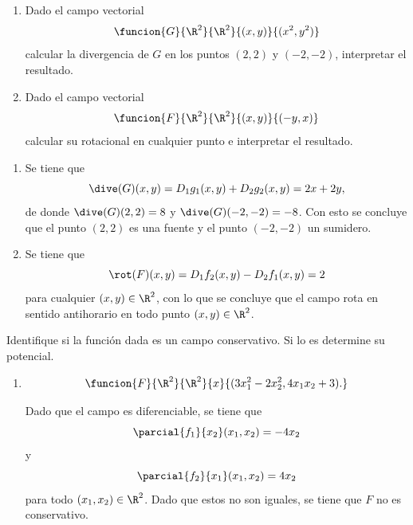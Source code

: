 \documentclass[a4,11pt]{aleph-examen}
\begin{document}
\begin{preguntas}
\begin{respuesta}
\begin{respuesta}
\item
    \begin{enumerate}
        \item Dado el campo vectorial
            \[
                \funcion{G}{\R^2}{\R^2}{(x,y)}{(x^2,y^2)}
            \]
            calcular la divergencia de $G$ en los puntos $(2,2)$ y $(-2,-2)$, interpretar el resultado.
    
        \item Dado el campo vectorial 
            \[
                \funcion{F}{\R^2}{\R^2}{(x,y)}{(-y,x)}
            \]
            calcular su rotacional en cualquier punto e interpretar el resultado.
    \end{enumerate}
\begin{respuesta}
    \begin{enumerate}
        \item Se tiene que
        \[
            \dive (G)(x,y)=D_1g_1(x,y)+D_2g_2(x,y)=2x+2y,
        \]
        de donde $\dive (G)(2,2)=8$ y $\dive (G)(-2,-2)=-8$. Con esto se concluye que el punto $(2,2)$ es una fuente y el punto $(-2,-2)$ un sumidero.
    
        \item Se tiene que
        \[
            \rot(F)(x,y)=D_1f_2(x,y)-D_2f_1(x,y)=2
        \]
        para cualquier $(x,y)\in\R^2$, con lo que se concluye que el campo rota en sentido antihorario en todo punto $(x,y)\in\R^2$.
    \end{enumerate}
    
\item 
	Identifique si la función dada es un campo conservativo. Si lo es determine su potencial.
	\begin{enumerate}
	\item 
		\[
			\funcion{F}{\R^2}{\R^2}{x}{(3x_1^2-2x_2^2,4x_1x_2+3).}
		\]

\begin{respuesta}
	Dado que el campo es diferenciable, se tiene que 
	\[
	    \parcial{f_1}{x_2}(x_1,x_2) = -4x_2
	\]
	y
	\[
	    \parcial{f_2}{x_1}(x_1,x_2) = 4x_2
	\]
	para todo $(x_1,x_2)\in\R^2$. Dado que estos no son iguales, se tiene que $F$ no es conservativo.
\end{respuesta}


\end{enumerate}
\end{respuesta}
\end{respuesta}
\end{respuesta}
\end{preguntas}
\end{document}
